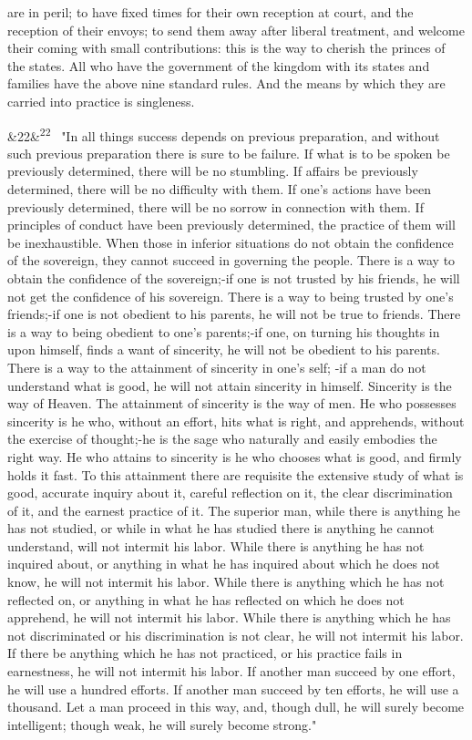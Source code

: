 \documentclass[12pt]{article}
\newcommand{\para}[1][]{\par\noindent\ifx&#1&\else\textsuperscript{\footnotesize #1}~\fi}
\begin{document}
are in peril; to have fixed times for their own reception at court, and the reception of their envoys; to send them away after liberal treatment, and welcome their coming with small contributions: this is the way to cherish the princes of the states. All who have the government of the kingdom with its states and families have the above nine standard rules. And the means by which they are carried into practice is singleness.

\para[22] "In all things success depends on previous preparation, and without such previous preparation there is sure to be failure. If what is to be spoken be previously determined, there will be no stumbling. If affairs be previously determined, there will be no difficulty with them. If one's actions have been previously determined, there will be no sorrow in connection with them. If principles of conduct have been previously determined, the practice of them will be inexhaustible. When those in inferior situations do not obtain the confidence of the sovereign, they cannot succeed in governing the people. There is a way to obtain the confidence of the sovereign;-if one is not trusted by his friends, he will not get the confidence of his sovereign. There is a way to being trusted by one's friends;-if one is not obedient to his parents, he will not be true to friends. There is a way to being obedient to one's parents;-if one, on turning his thoughts in upon himself, finds a want of sincerity, he will not be obedient to his parents. There is a way to the attainment of sincerity in one's self; -if a man do not understand what is good, he will not attain sincerity in himself. Sincerity is the way of Heaven. The attainment of sincerity is the way of men. He who possesses sincerity is he who, without an effort, hits what is right, and apprehends, without the exercise of thought;-he is the sage who naturally and easily embodies the right way. He who attains to sincerity is he who chooses what is good, and firmly holds it fast. To this attainment there are requisite the extensive study of what is good, accurate inquiry about it, careful reflection on it, the clear discrimination of it, and the earnest practice of it. The superior man, while there is anything he has not studied, or while in what he has studied there is anything he cannot understand, will not intermit his labor. While there is anything he has not inquired about, or anything in what he has inquired about which he does not know, he will not intermit his labor. While there is anything which he has not reflected on, or anything in what he has reflected on which he does not apprehend, he will not intermit his labor. While there is anything which he has not discriminated or his discrimination is not clear, he will not intermit his labor. If there be anything which he has not practiced, or his practice fails in earnestness, he will not intermit his labor. If another man succeed by one effort, he will use a hundred efforts. If another man succeed by ten efforts, he will use a thousand. Let a man proceed in this way, and, though dull, he will surely become intelligent; though weak, he will surely become strong."
\end{document}

